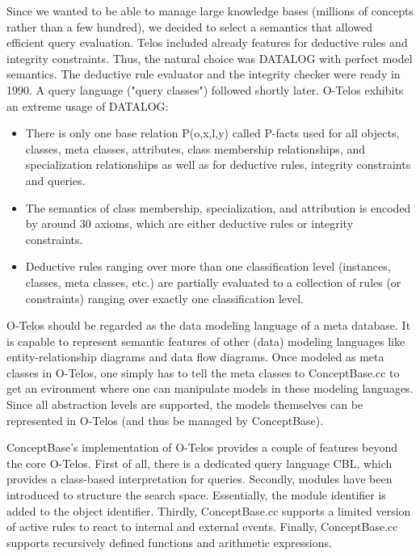 Since we wanted to be able to manage large knowledge bases (millions of concepts rather than a few hundred), 
we decided to select a semantics that allowed efficient query evaluation. Telos included already features 
for deductive rules and integrity constraints. Thus, the natural choice was DATALOG 
with perfect model semantics. The deductive rule evaluator and the integrity checker 
were ready in 1990. A query language ("query classes") followed shortly later. 
O-Telos exhibits an extreme usage of DATALOG:

\begin{itemize}
\item There is only one base relation P(o,x,l,y) called P-facts used for all objects, classes, meta classes, 
attributes, class membership relationships, and specialization relationships as well as for 
deductive rules, integrity constraints and queries.
\item The semantics of class membership, specialization, and attribution is encoded by around 30 axioms, 
which are either deductive rules or integrity constraints.
\item Deductive rules ranging over more than one classification level (instances, classes, meta 
classes, etc.) are partially evaluated to a collection of rules (or constraints) ranging over 
exactly one classification level.
\end{itemize}

O-Telos should be regarded as the data modeling language of a meta database. It is capable to 
represent semantic features of other (data) modeling languages like entity-relationship diagrams and 
data flow diagrams. Once modeled as meta classes in O-Telos, one simply has to tell the meta 
classes to ConceptBase.cc to get an evironment where one can manipulate models in these modeling languages. 
Since all abstraction levels are supported, the models themselves can be represented in 
O-Telos (and thus be managed by ConceptBase).

ConceptBase's implementation of O-Telos provides a couple of features beyond the core O-Telos. 
First of all, there is a dedicated query language CBL, which provides a class-based 
interpretation for queries. Secondly, modules have been introduced to structure the search space. 
Essentially, the module identifier is added to the object identifier. 
Thirdly, ConceptBase.cc supports a limited version of active rules to react to internal
and external events. 
Finally, ConceptBase.cc supports recursively defined functions and arithmetic expressions.


